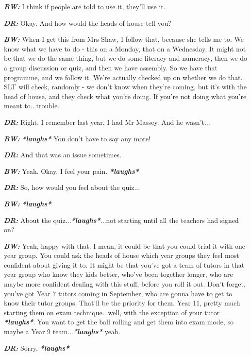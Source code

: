 \textit{\textbf{BW:}} I think if people are told to use it, they'll use it.

\textit{\textbf{DR:}} Okay. And how would the heads of house tell you?

\textit{\textbf{BW:}} When I get this from Mrs Shaw, I follow that, because she tells me to. We know what we have to do - this on a Monday, that on a Wednesday. It might not be that we do the same thing, but we do some literacy and numeracy, then we do a group discussion or quiz, and then we have assembly. So we have that programme, and we follow it. We're actually checked up on whether we do that. SLT will check, randomly - we don't know when they're coming, but it's with the head of house, and they check what you're doing. If you're not doing what you're meant to...trouble.

\textit{\textbf{DR:}} Right. I remember last year, I had Mr Massey. And he wasn't...

\textit{\textbf{BW:}} \textit{\textbf{*laughs*}} You don't have to say any more!

\textit{\textbf{DR:}} And that was an issue sometimes.

\textit{\textbf{BW:}} Yeah. Okay. I feel your pain. \textit{\textbf{*laughs*}}

\textit{\textbf{DR:}} So, how would you feel about the quiz...

\textit{\textbf{BW:}} \textit{\textbf{*laughs*}}

\textit{\textbf{DR:}} About the quiz...\textit{\textbf{*laughs*}}...not starting until all the teachers had signed on?

\textit{\textbf{BW:}} Yeah, happy with that. I mean, it could be that you could trial it with one year group. You could ask the heads of house which year groups they feel most confident about giving it to. It might be that you've got a team of tutors in that year group who know they kids better, who've been together longer, who are maybe more confident dealing with this stuff, before you roll it out. Don't forget, you've got Year 7 tutors coming in September, who are gonna have to get to know their tutor groups. That'll be the priority for them. Year 11, pretty much starting them on exam technique...well, with the exception of your tutor \textit{\textbf{*laughs*}}. You want to get the ball rolling and get them into exam mode, so maybe a Year 9 team...\textit{\textbf{*laughs*}} yeah.

\textit{\textbf{DR:}} Sorry. \textit{\textbf{*laughs*}}

